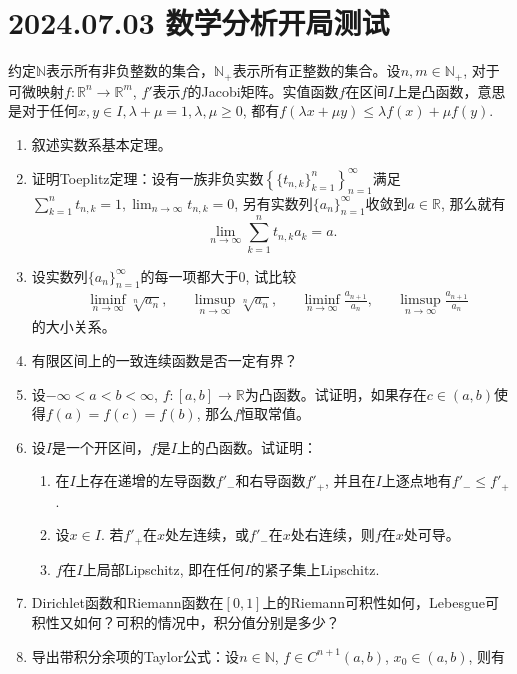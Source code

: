 \documentclass{ctexart}
\newcommand{\realset}{\mathbb{R}}
\newcommand{\naturalset}{\mathbb{N}}
\newcommand{\positiveinteger}{\mathbb{N_+}}
\begin{document}
\section*{2024.07.03 数学分析开局测试}
约定$\naturalset$表示所有非负整数的集合，$\positiveinteger$表示所有正整数的集合。设$n,m\in\positiveinteger$, 对于可微映射$f\colon \realset^n\to\realset^m$, $f'$表示$f$的Jacobi矩阵。实值函数$f$在区间$I$上是凸函数，意思是对于任何$x,y\in I,\lambda+\mu=1,\lambda,\mu\geqslant 0$, 都有$f(\lambda x+\mu y)\leqslant \lambda f(x)+\mu f(y)$.
\begin{enumerate}
    \item 叙述实数系基本定理。
    \item 证明Toeplitz定理：设有一族非负实数$\left\{\{t_{n,k}\}_{k=1}^n\right\}_{n=1}^\infty$满足$\sum_{k=1}^{n}t_{n,k}=1,\lim_{n\to\infty}t_{n,k}=0$, 另有实数列$\{a_n\}_{n=1}^\infty$收敛到$a\in \realset$, 那么就有\begin{equation*}
        \lim_{n\to \infty}\sum_{k=1}^{n}t_{n,k}a_k=a.
    \end{equation*}
    \item 设实数列$\{a_n\}_{n=1}^{\infty}$的每一项都大于0, 试比较\begin{align*}
        &\liminf_{n\to\infty}\sqrt[n]{a_n},&&\limsup_{n\to\infty}\sqrt[n]{a_n},&&\liminf_{n\to\infty}\frac{a_{n+1}}{a_n},&&\limsup_{n\to\infty}\frac{a_{n+1}}{a_n}
    \end{align*}的大小关系。
    \item 有限区间上的一致连续函数是否一定有界？
    \item 设$-\infty<a<b<\infty$, $f\colon [a,b]\to\realset$为凸函数。试证明，如果存在$c\in(a,b)$使得$f(a)=f(c)=f(b)$, 那么$f$恒取常值。
    \item 设$I$是一个开区间，$f$是$I$上的凸函数。试证明：
    \begin{enumerate}
        \item 在$I$上存在递增的左导函数$f'_-$和右导函数$f'_+$, 并且在$I$上逐点地有$f'_-\leqslant f'_+$.
        \item 设$x\in I$. 若$f'_+$在$x$处左连续，或$f'_-$在$x$处右连续，则$f$在$x$处可导。
        \item $f$在$I$上局部Lipschitz, 即在任何$I$的紧子集上Lipschitz.
    \end{enumerate}
    \item Dirichlet函数和Riemann函数在$[0,1]$上的Riemann可积性如何，Lebesgue可积性又如何？可积的情况中，积分值分别是多少？
    \item 导出带积分余项的Taylor公式：设$n\in\naturalset$, $f\in C^{n+1}(a,b)$, $x_0\in (a,b)$, 则有\begin{equation*}

\end{equation*}
\end{enumerate}
\end{document}
